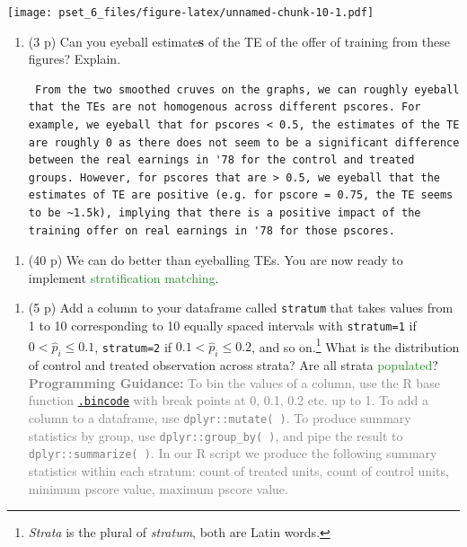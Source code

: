 \documentclass[
]{article}
\providecommand{\tightlist}{%
  \setlength{\itemsep}{0pt}\setlength{\parskip}{0pt}}
\begin{document}
\texttt{[image: pset\_6\_files/figure-latex/unnamed-chunk-10-1.pdf]}

\begin{enumerate}
\def\labelenumi{\alph{enumi}.}
\setcounter{enumi}{1}
\item
  (3 p) Can you eyeball estimate\textbf{s} of the TE of the offer of
  training from these figures? Explain.

\begin{verbatim}
 From the two smoothed cruves on the graphs, we can roughly eyeball that the TEs are not homogenous across different pscores. For example, we eyeball that for pscores < 0.5, the estimates of the TE are roughly 0 as there does not seem to be a significant difference between the real earnings in '78 for the control and treated groups. However, for pscores that are > 0.5, we eyeball that the estimates of TE are positive (e.g. for pscore = 0.75, the TE seems to be ~1.5k), implying that there is a positive impact of the training offer on real earnings in '78 for those pscores.
\end{verbatim}
\end{enumerate}

\begin{enumerate}
\def\labelenumi{\arabic{enumi}.}
\setcounter{enumi}{2}
\tightlist
\item
  (40 p) We can do better than eyeballing TEs. You are now ready to
  implement \textcolor{ForestGreen}{stratification matching}.
\end{enumerate}

\begin{enumerate}
\def\labelenumi{\alph{enumi}.}
\tightlist
\item
  (5 p) Add a column to your dataframe called \texttt{stratum} that
  takes values from 1 to 10 corresponding to 10 equally spaced intervals
  with \texttt{stratum=1} if \(0<\widehat{p}_{i}\leq 0.1\),
  \texttt{stratum=2} if \(0.1<\widehat{p}_{i}\leq 0.2\), and so
  on.\footnote{\textit{Strata} is the plural of \textit{stratum}, both are Latin words.}
  What is the distribution of control and treated observation across
  strata? Are all strata \textcolor{ForestGreen}{populated}?
  \textcolor{gray}{\textbf{Programming Guidance:} To bin the values of a column, use the R base function \href{https://www.rdocumentation.org/packages/base/versions/3.6.2/topics/.bincode( )}{\texttt{.bincode}} with break points at 0, 0.1, 0.2 etc. up to 1. To add a column to a dataframe, use \texttt{dplyr::mutate( )}. To produce summary statistics by group, use \texttt{dplyr::group\_by( )}, and pipe the result to \texttt{dplyr::summarize( )}. In our R script we produce the following summary statistics within each stratum: count of treated units, count of control units, minimum pscore value, maximum pscore value.}
\end{enumerate}
\end{document}

